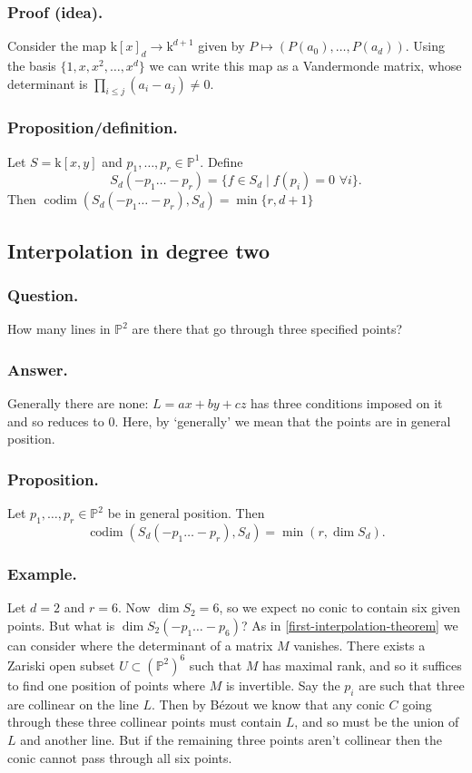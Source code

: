 \documentclass[10pt]{article}
\numberwithin{equation}{subsubsection}
\DeclareMathOperator{\codim}{codim}
\renewcommand{\P}{\mathbb{P}}
\renewcommand{\k}{\mathrm{k}}
\begin{document}
            \subsubsection{Proof (idea).} Consider the map $\k[x]_d\to\k^{d+1}$ given by $P\mapsto(P(a_0),\ldots,P(a_d))$. Using the basis $\{1,x,x^2,\ldots,x^d\}$ we can write this map as a Vandermonde matrix, whose determinant is $\prod_{i\leqslant j}(a_i-a_j)\neq0$.
            
            \subsubsection{Proposition/definition.} Let $S=\k[x,y]$ and $p_1,\ldots,p_r\in\P^1$. Define \[S_d(-p_1\ldots-p_r)=\{f\in S_d \mid f(p_i)=0\,\,\forall i\}.\]
                Then $\codim(S_d(-p_1\ldots-p_r),S_d)=\min\{r,d+1\}$
    
        \subsection{Interpolation in degree two}
        
            \subsubsection{Question.} How many lines in $\P^2$ are there that go through three specified points?
            
            \subsubsection{Answer.} Generally there are none: $L=ax+by+cz$ has three conditions imposed on it and so reduces to $0$. Here, by `generally' we mean that the points are in general position.
            
            \subsubsection{Proposition.}\label{second-interpolation-theorem} Let $p_1,\ldots,p_r\in\P^2$ be in general position. Then \[\codim(S_d(-p_1\ldots-p_r),S_d)=\min(r,\dim S_d).\]
            
            \subsubsection{Example.} Let $d=2$ and $r=6$. Now $\dim S_2=6$, so we expect no conic to contain six given points. But what is $\dim S_2(-p_1\ldots-p_6)$? As in \ref{first-interpolation-theorem} we can consider where the determinant of a matrix $M$ vanishes. There exists a Zariski open subset $U\subset(\P^2)^6$ such that $M$ has maximal rank, and so it suffices to find one position of points where $M$ is invertible.
                Say the $p_i$ are such that three are collinear on the line $L$. Then by Bézout we know that any conic $C$ going through these three collinear points must contain $L$, and so must be the union of $L$ and another line.
                But if the remaining three points aren't collinear then the conic cannot pass through all six points.
                
\end{document}
